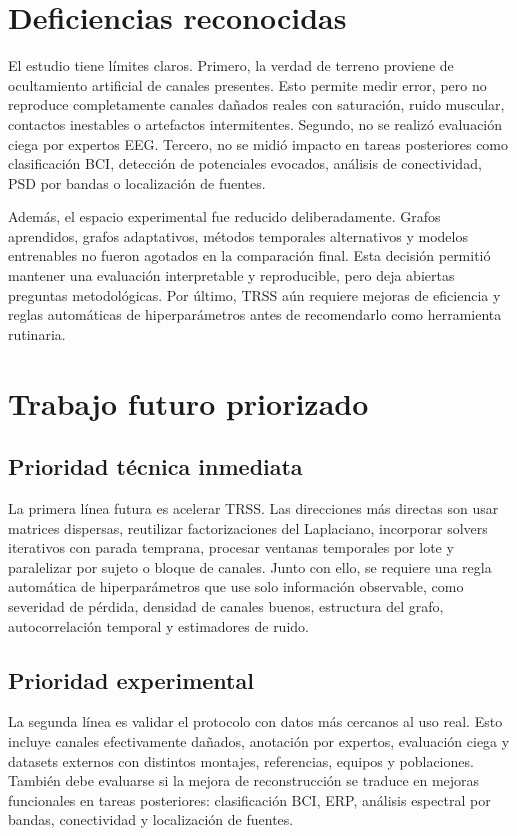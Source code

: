\section{Deficiencias reconocidas}

El estudio tiene límites claros. Primero, la verdad de terreno proviene de ocultamiento artificial de canales presentes. Esto permite medir error, pero no reproduce completamente canales dañados reales con saturación, ruido muscular, contactos inestables o artefactos intermitentes. Segundo, no se realizó evaluación ciega por expertos EEG. Tercero, no se midió impacto en tareas posteriores como clasificación BCI, detección de potenciales evocados, análisis de conectividad, PSD por bandas o localización de fuentes.

Además, el espacio experimental fue reducido deliberadamente. Grafos aprendidos, grafos adaptativos, métodos temporales alternativos y modelos entrenables no fueron agotados en la comparación final. Esta decisión permitió mantener una evaluación interpretable y reproducible, pero deja abiertas preguntas metodológicas. Por último, TRSS aún requiere mejoras de eficiencia y reglas automáticas de hiperparámetros antes de recomendarlo como herramienta rutinaria.

\section{Trabajo futuro priorizado}

\subsection*{Prioridad técnica inmediata}

La primera línea futura es acelerar TRSS. Las direcciones más directas son usar matrices dispersas, reutilizar factorizaciones del Laplaciano, incorporar solvers iterativos con parada temprana, procesar ventanas temporales por lote y paralelizar por sujeto o bloque de canales. Junto con ello, se requiere una regla automática de hiperparámetros que use solo información observable, como severidad de pérdida, densidad de canales buenos, estructura del grafo, autocorrelación temporal y estimadores de ruido.

\subsection*{Prioridad experimental}

La segunda línea es validar el protocolo con datos más cercanos al uso real. Esto incluye canales efectivamente dañados, anotación por expertos, evaluación ciega y datasets externos con distintos montajes, referencias, equipos y poblaciones. También debe evaluarse si la mejora de reconstrucción se traduce en mejoras funcionales en tareas posteriores: clasificación BCI, ERP, análisis espectral por bandas, conectividad y localización de fuentes.

